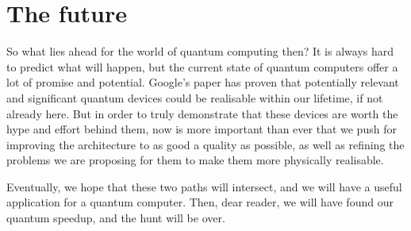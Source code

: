 \section{The future}

So what lies ahead for the world of quantum computing then? It is always hard to predict what will happen, but the current state of quantum computers offer a lot of promise and potential. Google's paper has proven that potentially relevant and significant quantum devices could be realisable within our lifetime, if not already here. But in order to truly demonstrate that these devices are worth the hype and effort behind them, now is more important than ever that we push for improving the architecture to as good a quality as possible, as well as refining the problems we are proposing for them to make them more physically realisable.

Eventually, we hope that these two paths will intersect, and we will have a useful application for a quantum computer. Then, dear reader, we will have found our quantum speedup, and the hunt will be over.
